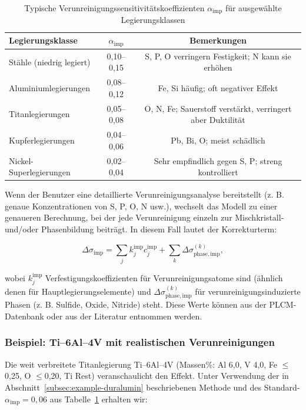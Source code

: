 \documentclass[12pt,a4paper]{article}
\begin{document}
	\begin{table}[htbp]
		\centering
		\caption{Typische Verunreinigungssensitivitätskoeffizienten \(\alpha_{\mathrm{imp}}\) für ausgewählte Legierungsklassen}
		\label{tab:impurity-coefficients}
		\begin{tabular}{lcc}
			\toprule
			\textbf{Legierungsklasse} & \(\alpha_{\mathrm{imp}}\) & \textbf{Bemerkungen} \\
			\midrule
			Stähle (niedrig legiert) & 0,10–0,15 & S, P, O verringern Festigkeit; N kann sie erhöhen \\
			Aluminiumlegierungen & 0,08–0,12 & Fe, Si häufig; oft negativer Effekt \\
			Titanlegierungen & 0,05–0,08 & O, N, Fe; Sauerstoff verstärkt, verringert aber Duktilität \\
			Kupferlegierungen & 0,04–0,06 & Pb, Bi, O; meist schädlich \\
			Nickel-Superlegierungen & 0,02–0,04 & Sehr empfindlich gegen S, P; streng kontrolliert \\
			\bottomrule
		\end{tabular}
	\end{table}
	
	Wenn der Benutzer eine detaillierte Verunreinigungsanalyse bereitstellt (z. B. genaue Konzentrationen von S, P, O, N usw.), wechselt das Modell zu einer genaueren Berechnung, bei der jede Verunreinigung einzeln zur Mischkristall- und/oder Phasenbildung beiträgt. In diesem Fall lautet der Korrekturterm:
	
	\[
	\Delta\sigma_{\mathrm{imp}} = \sum_{j} k_j^{\mathrm{imp}} c_j^{\mathrm{imp}} + \sum_{k} \Delta\sigma_{\mathrm{phase,imp}}^{(k)},
	\]
	
	wobei \(k_j^{\mathrm{imp}}\) Verfestigungskoeffizienten für Verunreinigungsatome sind (ähnlich denen für Hauptlegierungselemente) und \(\Delta\sigma_{\mathrm{phase,imp}}^{(k)}\) für verunreinigungsinduzierte Phasen (z. B. Sulfide, Oxide, Nitride) steht. Diese Werte können aus der PLCM-Datenbank oder aus der Literatur entnommen werden.
	
	\subsubsection*{Beispiel: Ti--6Al--4V mit realistischen Verunreinigungen}
	
	Die weit verbreitete Titanlegierung Ti--6Al--4V (Massen\%: Al 6,0, V 4,0, Fe \(\le\)0,25, O \(\le\)0,20, Ti Rest) veranschaulicht den Effekt. Unter Verwendung der in Abschnitt~\ref{subsec:example-duralumin} beschriebenen Methode und des Standard-\(\alpha_{\mathrm{imp}}=0,06\) aus Tabelle~\ref{tab:impurity-coefficients} erhalten wir:
	
\end{document}
